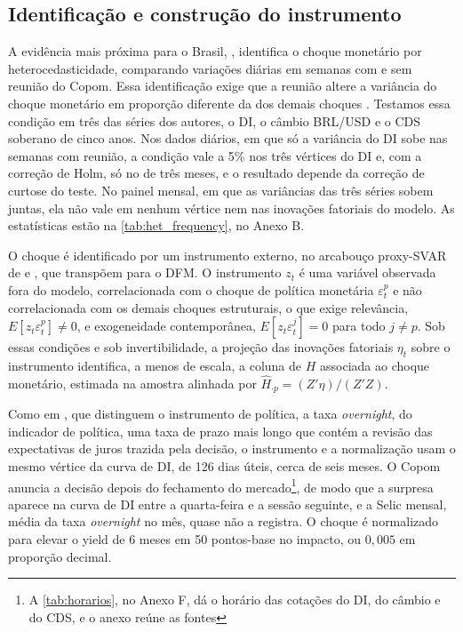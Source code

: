 \documentclass[preprint,authoryear,review,12pt]{elsarticle}
\begin{document}
\subsection{Identificação e construção do instrumento}
\label{sec:identificacao}

A evidência mais próxima para o Brasil, \cite{goncalves2025}, identifica o choque monetário por heterocedasticidade, comparando variações diárias em semanas com e sem reunião do Copom. Essa identificação exige que a reunião altere a variância do choque monetário em proporção diferente da dos demais choques \citep{rigobon2003}. Testamos essa condição em três das séries dos autores, o DI, o câmbio BRL/USD e o CDS soberano de cinco anos. Nos dados diários, em que só a variância do DI sobe nas semanas com reunião, a condição vale a 5\% nos três vértices do DI e, com a correção de Holm, só no de três meses, e o resultado depende da correção de curtose do teste. No painel mensal, em que as variâncias das três séries sobem juntas, ela não vale em nenhum vértice nem nas inovações fatoriais do modelo. As estatísticas estão na \autoref{tab:het_frequency}, no Anexo B.

O choque é identificado por um instrumento externo, no arcabouço proxy-SVAR de \cite{stockwatson2018} e \cite{gertler2015}, que \cite{alessi} transpõem para o DFM. O instrumento $z_t$ é uma variável observada fora do modelo, correlacionada com o choque de política monetária $\varepsilon_t^{p}$ e não correlacionada com os demais choques estruturais, o que exige relevância, $E[z_t \varepsilon_t^{p}] \neq 0$, e exogeneidade contemporânea, $E[z_t \varepsilon_t^{j}] = 0$ para todo $j \neq p$. Sob essas condições e sob invertibilidade, a projeção das inovações fatoriais $\eta_t$ sobre o instrumento identifica, a menos de escala, a coluna de $H$ associada ao choque monetário, estimada na amostra alinhada por $\hat{H}_{\cdot p} = (Z'\eta)/(Z'Z)$.

Como em \cite{gertler2015}, que distinguem o instrumento de política, a taxa \textit{overnight}, do indicador de política, uma taxa de prazo mais longo que contém a revisão das expectativas de juros trazida pela decisão, o instrumento e a normalização usam o mesmo vértice da curva de DI, de 126 dias úteis, cerca de seis meses. O Copom anuncia a decisão depois do fechamento do mercado\footnote{A \autoref{tab:horarios}, no Anexo F, dá o horário das cotações do DI, do câmbio e do CDS, e o anexo reúne as fontes}, de modo que a surpresa aparece na curva de DI entre a quarta-feira e a sessão seguinte, e a Selic mensal, média da taxa \textit{overnight} no mês, quase não a registra. O choque é normalizado para elevar o yield de 6 meses em 50 pontos-base no impacto, ou $0{,}005$ em proporção decimal.
\end{document}
